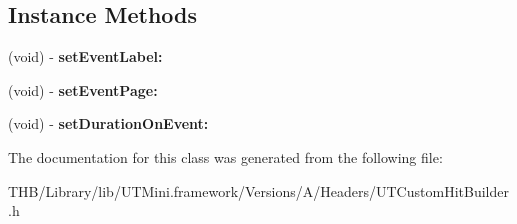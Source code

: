 \subsection*{Instance Methods}
\begin{DoxyCompactItemize}
\item 
\mbox{\label{interface_u_t_custom_hit_builder_a9d3217cd15fef160db72f90f21921717}} 
(void) -\/ {\bfseries set\+Event\+Label\+:}
\item 
\mbox{\label{interface_u_t_custom_hit_builder_aa480cec0f6be9f80efc0c0c44e820abe}} 
(void) -\/ {\bfseries set\+Event\+Page\+:}
\item 
\mbox{\label{interface_u_t_custom_hit_builder_a1a17f63f249f6c5aeb4c61e11ca65d6d}} 
(void) -\/ {\bfseries set\+Duration\+On\+Event\+:}
\end{DoxyCompactItemize}


The documentation for this class was generated from the following file\+:\begin{DoxyCompactItemize}
\item 
T\+H\+B/\+Library/lib/\+U\+T\+Mini.\+framework/\+Versions/\+A/\+Headers/U\+T\+Custom\+Hit\+Builder.\+h\end{DoxyCompactItemize}
